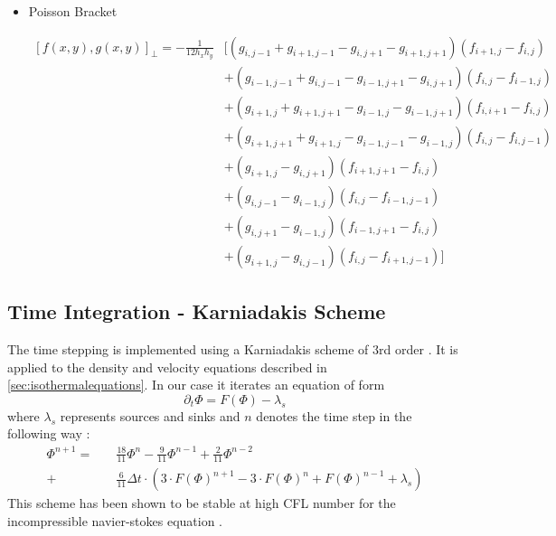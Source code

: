 \documentclass[master.tex]{subfiles}
\begin{document}
\begin{itemize}
\begin{footnotesize}
\end{footnotesize}      %
    \item Poisson Bracket \\
    \begin{footnotesize}
        \begin{equation}
            \begin{split}
                [f(x,y), g(x,y)]_\perp = -\frac{1}{12h_xh_y} & [
                    (g_{i, j-1} + g_{i+1,j-1} - g_{i, j+ 1} - g_{i+1,j+1})(f_{i+1,j}-f_{i, j}) \\
                    &+ (g_{i-1,j-1}+g_{i,j-1}-g_{i-1,j+1} - g_{i,j+1})(f_{i,j}-f_{i-1,j})\\
                    &+ (g_{i+1,j}+g_{i+1,j+1}-g_{i-1,j}-g_{i-1,j+1})(f_{i,i+1}-f_{i,j})\\
                    &+ (g_{i+1,j+1}+g_{i+1,j}-g_{i-1,j-1}-g_{i-1,j})(f_{i,j}-f_{i,j-1})\\
                    &+ (g_{i+1, j} - g_{i, j + 1})(f_{i+1,j+1}-f_{i,j})\\
                    &+ (g_{i, j-1} - g_{i-1, j})(f_{i,j}-f_{i-1,j-1})\\
                    &+ (g_{i,j+1}-g_{i-1,j})(f_{i-1,j+1}-f_{i,j})\\
                    &+ (g_{i+1, j} - g_{i,j-1})(f_{i,j}-f_{i+1,j-1}) ]
            \end{split}
        \end{equation}
    \end{footnotesize}


\end{itemize}

\subsection{Time Integration - Karniadakis Scheme}
The time stepping is implemented using a Karniadakis scheme of 3rd order \cite{KARNIADAKIS1991414}.
It is applied to the density and velocity equations described in \autoref{sec:isothermalequations}.
In our case it iterates an equation of form
\begin{equation}
    \partial_t \Phi = F(\Phi) - \lambda_s
\end{equation}
where $\lambda_s$ represents sources and sinks and $n$ denotes the time step in the following way :
\begin{equation}\label{eq:karnidakis-scheme}
\begin{split}
    \Phi^{n + 1} = \quad &\frac{18}{11} \Phi^{n} - \frac{9}{11} \Phi^{n-1} + \frac{2}{11}  \Phi^{n-2}\\
     + &\frac{6}{11}\Delta t \cdot (3 \cdot F(\Phi)^{n+1} - 3 \cdot F(\Phi)^{n} + F(\Phi)^{n-1} + \lambda_s)
\end{split}
\end{equation}
This scheme has been shown to be stable at high \ac{CFL} number for the incompressible navier-stokes equation \cite{KARNIADAKIS1991414}.
\end{document}
